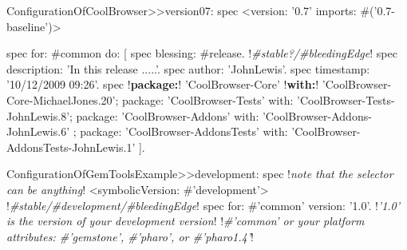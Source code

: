 \documentclass[a4paper,10pt,twoside]{book}
\begin{document}
\begin{footnotesize}
\begin{code}{}
ConfigurationOfCoolBrowser>>version07: spec 
       <version: '0.7' imports: #('0.7-baseline')>
       
       spec for: #common do: [
              spec blessing: #release.			!\emph{\#stable?/\#bleedingEdge}!
              spec description: 'In this release .....'.
              spec author: 'JohnLewis'.
              spec timestamp: '10/12/2009 09:26'.
              spec 
                     !\textbf{package:}! 'CoolBrowser-Core' !\textbf{with:}! 'CoolBrowser-Core-MichaelJones.20';
                     package: 'CoolBrowser-Tests' with: 'CoolBrowser-Tests-JohnLewis.8';
                     package: 'CoolBrowser-Addons' with: 'CoolBrowser-Addons-JohnLewis.6' ;
                     package: 'CoolBrowser-AddonsTests' with: 'CoolBrowser-AddonsTests-JohnLewis.1' ].
\end{code}
\end{footnotesize} 

\begin{footnotesize}
\begin{code}{}
ConfigurationOfGemToolsExample>>development: spec        !\emph{note that the selector can be anything}!
       <symbolicVersion: #'development'>    				!\emph{\#stable/\#development/\#bleedingEdge}!
       spec for: #'common' version: '1.0'.	                   !\emph{'1.0' is the version of your development version}!
       !\emph{\#'common' or your platform attributes: \#'gemstone', \#'pharo', or \#'pharo1.4'}!
\end{code}
\end{footnotesize} 
\end{document}
